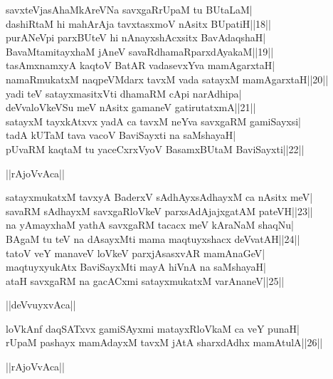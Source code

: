\documentclass{article}
\begin{document}
savxteVjasAhaMkAreVNa savxgaRrUpaM tu BUtaLaM|\\
dashiRtaM hi mahArAja tavxtasxmoV nAsitx BUpatiH||18||\\
purANeVpi parxBUteV hi nAnayxshAcxsitx BavAdaqshaH|\\
BavaMtamitayxhaM jAneV savaRdhamaRparxdAyakaM||19||\\
tasAmxnamxyA kaqtoV BatAR vadasevxYva mamAgarxtaH|\\
namaRmukatxM naqpeVMdarx tavxM vada satayxM mamAgarxtaH||20||\\
yadi teV satayxmasitxVti dhamaRM cApi narAdhipa|\\
deVvaloVkeVSu meV nAsitx gamaneV gatirutatxmA||21||\\
satayxM tayxkAtxvx yadA ca tavxM neYva savxgaRM gamiSayxsi|\\
tadA kUTaM tava vacoV BaviSayxti na saMshayaH|\\
pUvaRM kaqtaM tu yaceCxrxVyoV BasamxBUtaM BaviSayxti||22||\\

\begin{center}
||rAjoVvAca||
\end{center}

satayxmukatxM tavxyA BaderxV sAdhAyxsAdhayxM ca nAsitx meV|\\
savaRM sAdhayxM savxgaRloVkeV parxsAdAjajxgatAM pateVH||23||\\
na yAmayxhaM yathA savxgaRM tacacx meV kAraNaM shaqNu|\\
BAgaM tu teV na dAsayxMti mama maqtuyxshacx deVvatAH||24||\\
tatoV veY manaveV loVkeV parxjAsasxvAR mamAnaGeV|\\
maqtuyxyukAtx BaviSayxMti mayA hiVnA na saMshayaH|\\
ataH savxgaRM na gacACxmi satayxmukatxM varAnaneV||25||\\

\begin{center}
||deVvuyxvAca||
\end{center}

loVkAnf daqSATxvx gamiSAyxmi matayxRloVkaM ca veY punaH|\\
rUpaM pashayx mamAdayxM tavxM jAtA sharxdAdhx mamAtulA||26||\\

\begin{center}
||rAjoVvAca||
\end{center}
\end{document}
